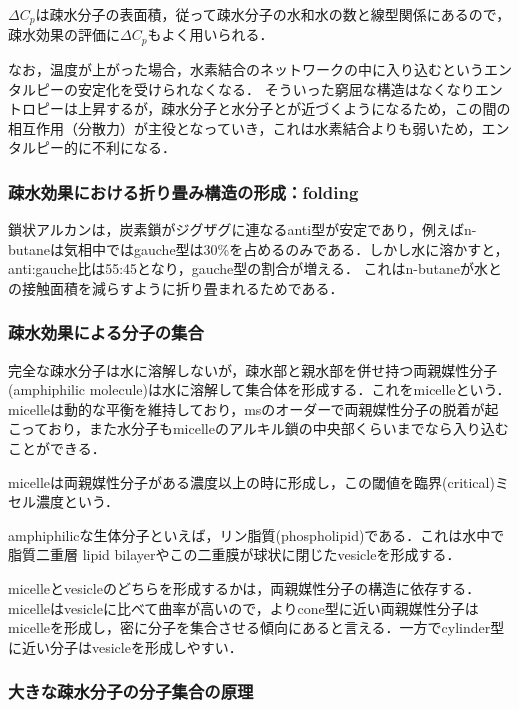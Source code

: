 \documentclass[uplatex, dvipdfmx]{jsreport}
\begin{document}
\begin{fact}[溶液全体のモル定圧熱容量変化に注目する]
    $\Delta C_p$は疎水分子の表面積，従って疎水分子の水和水の数と線型関係にあるので，疎水効果の評価に$\Delta C_p$もよく用いられる．
\end{fact}

なお，温度が上がった場合，水素結合のネットワークの中に入り込むというエンタルピーの安定化を受けられなくなる．
そういった窮屈な構造はなくなりエントロピーは上昇するが，疎水分子と水分子とが近づくようになるため，この間の相互作用（分散力）が主役となっていき，これは水素結合よりも弱いため，エンタルピー的に不利になる．

\subsubsection{疎水効果における折り畳み構造の形成：folding}

鎖状アルカンは，炭素鎖がジグザグに連なるanti型が安定であり，例えばn-butaneは気相中ではgauche型は30\%を占めるのみである．しかし水に溶かすと，anti:gauche比は55:45となり，gauche型の割合が増える．
これはn-butaneが水との接触面積を減らすように折り畳まれるためである．

\subsubsection{疎水効果による分子の集合}

完全な疎水分子は水に溶解しないが，疎水部と親水部を併せ持つ両親媒性分子(amphiphilic molecule)は水に溶解して集合体を形成する．これをmicelleという．
micelleは動的な平衡を維持しており，msのオーダーで両親媒性分子の脱着が起こっており，また水分子もmicelleのアルキル鎖の中央部くらいまでなら入り込むことができる．

micelleは両親媒性分子がある濃度以上の時に形成し，この閾値を臨界(critical)ミセル濃度という．

amphiphilicな生体分子といえば，リン脂質(phospholipid)である．これは水中で脂質二重層 lipid bilayerやこの二重膜が球状に閉じたvesicleを形成する．

micelleとvesicleのどちらを形成するかは，両親媒性分子の構造に依存する．micelleはvesicleに比べて曲率が高いので，よりcone型に近い両親媒性分子はmicelleを形成し，密に分子を集合させる傾向にあると言える．一方でcylinder型に近い分子はvesicleを形成しやすい．

\subsubsection{大きな疎水分子の分子集合の原理}
\end{document}

